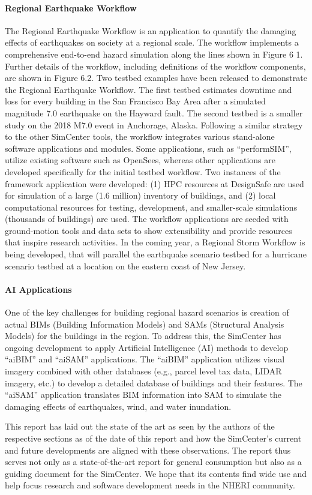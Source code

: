 \paragraph{Regional Earthquake Workflow} The Regional Earthquake Workflow is an application to quantify the damaging effects of earthquakes on society at a regional scale. The workflow implements a comprehensive end-to-end hazard simulation along the lines shown in Figure 6 1. Further details of the workflow, including definitions of the workflow components, are shown in Figure 6.2. Two testbed examples have been released to demonstrate the Regional Earthquake Workflow. The first testbed estimates downtime and loss for every building in the San Francisco Bay Area after a simulated magnitude 7.0 earthquake on the Hayward fault. The second testbed is a smaller study on the 2018 M7.0 event in Anchorage, Alaska. Following a similar strategy to the other SimCenter tools, the workflow integrates various stand-alone software applications and modules. Some applications, such as “performSIM”, utilize existing software such as OpenSees, whereas other applications are developed specifically for the initial testbed workflow. Two instances of the framework application were developed:        (1) HPC resources at DesignSafe are used for simulation of a large (1.6 million) inventory of buildings, and (2) local computational resources for testing, development, and smaller-scale simulations (thousands of buildings) are used. The workflow applications are seeded with ground-motion tools and data sets to show extensibility and provide resources that inspire research activities. In the coming year, a Regional Storm Workflow is being developed, that will parallel the earthquake scenario testbed for a hurricane scenario testbed at a location on the eastern coast of New Jersey.

\paragraph{AI Applications} One of the key challenges for building regional hazard scenarios is creation of actual BIMs (Building Information Models) and SAMs (Structural Analysis Models) for the buildings in the region. To address this, the SimCenter has ongoing development to apply Artificial Intelligence (AI) methods to develop ``aiBIM'' and ``aiSAM'' applications. The ``aiBIM'' application utilizes visual imagery combined with other databases (e.g., parcel level tax data, LIDAR imagery, etc.) to develop a detailed database of buildings and their features. The ``aiSAM'' application translates BIM information into SAM to simulate the damaging effects of earthquakes, wind, and water inundation.

\noindent This report has laid out the state of the art as seen by the authors of the respective sections as of the date of this report and how the SimCenter's current and future developments are aligned with these observations. The report thus serves not only as a state-of-the-art report for general consumption but also as a guiding document for the SimCenter. We hope that its contents find wide use and help focus research and software development needs in the NHERI community.